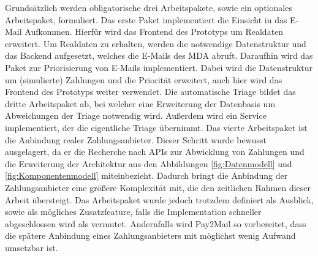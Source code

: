 \noindent Grundsätzlich werden obligatorische drei Arbeitspakete, sowie ein optionales Arbeitspaket, formuliert. Das erste Paket implementiert die Einsicht in das E-Mail Aufkommen. Hierfür wird das Frontend des Prototyps um Realdaten erweitert. Um Realdaten zu erhalten, werden die notwendige Datenstruktur und das Backend aufgesetzt, welches die E-Mails des MDA abruft. Daraufhin wird das Paket zur Priorisierung von E-Mails implementiert. Dabei wird die Datenstruktur um (simulierte) Zahlungen und die Priorität erweitert, auch hier wird das Frontend des Prototyps weiter verwendet. Die automatische Triage bildet das dritte Arbeitspaket ab, bei welcher eine Erweiterung der Datenbasis um Abweichungen der Triage notwendig wird. Außerdem wird ein Service implementiert, der die eigentliche Triage übernimmt. Das vierte Arbeitspaket ist die Anbindung realer Zahlungsanbieter. Dieser Schritt wurde bewusst ausgelagert, da er die Recherche nach APIs zur Abwicklung von Zahlungen und die Erweiterung der Architektur aus den Abbildungen \ref{fig:Datenmodell} und \ref{fig:Komponentenmodell} miteinbezieht. Dadurch bringt die Anbindung der Zahlungsanbieter eine größere Komplexität mit, die den zeitlichen Rahmen dieser Arbeit übersteigt. Das Arbeitspaket wurde jedoch trotzdem definiert als Ausblick, sowie als mögliches Zusatzfeature, falls die Implementation schneller abgeschlossen wird als vermutet. Andernfalls wird Pay2Mail so vorbereitet, dass die spätere Anbindung eines Zahlungsanbieters mit möglichst wenig Aufwand umsetzbar ist. 

